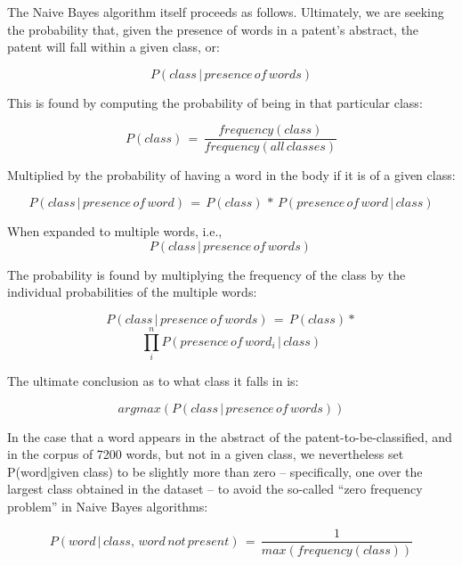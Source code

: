\documentclass{article}
\begin{document}
The Naive Bayes algorithm itself proceeds as follows.  Ultimately, we are seeking the probability that, given the presence of words in a patent’s abstract, the patent will fall within a given class, or:

\begin{equation}
P(class\, |\, presence\, of\, words)
\end{equation}

This is found by computing the probability of being in that particular class:

\begin{equation}
P(class)\, =\,  \frac{frequency(class)}{frequency(all\, classes)}
\end{equation}

Multiplied by the probability of having a word in the body if it is of a given class:

\begin{equation}
P(class\, |\, presence\, of\, word)\, =\, P(class)\, *\, P(presence\, of\, word\, |\, class)
\end{equation}

When expanded to multiple words, i.e.,
\begin{equation}
P(class\, |\, presence\, of\, words)\, 
\end{equation}

The probability is found by multiplying the frequency of the class by the individual probabilities of the multiple words:

\begin{equation}
P(class\, |\, presence\, of\, words)\, =\, P(class)* \end{equation}\[ \prod_{i}^{n}P(presence\, of\, word_i\, |\, class) \]
 
  The ultimate conclusion as to what class it falls in is:
  
\begin{equation}
argmax(P(class\, |\, presence\, of\, words))
\end{equation}

In the case that a word appears in the abstract of the patent-to-be-classified, and in the corpus of 7200 words, but not in a given class, we nevertheless set P(word|given class) to be slightly more than zero – specifically, one over the largest class obtained in the dataset – to avoid the so-called “zero frequency problem” in Naive Bayes algorithms:

\begin{equation}
P(word\, |\, class,\, word\, not\, present)\, =\, \frac{1}{max(frequency(class))}
\end{equation}
\end{document}

